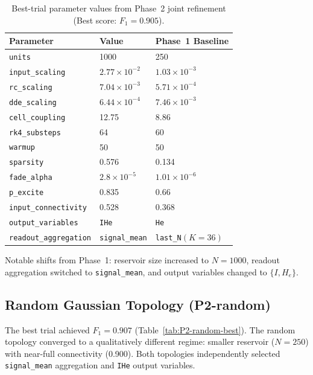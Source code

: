 \documentclass[journal=asbcd6,manuscript=suppinfo]{achemso}
\begin{document}
\begin{table}[H]
    \centering
    \caption{Best-trial parameter values from Phase~2 joint refinement (Best score: $F_1 = 0.905$).}
    \label{tab:P2-distance-best}\small %
    \begin{tabular}{lll}
        \toprule
        Parameter & Value & Phase~1 Baseline \\
        \midrule
        \texttt{units} & 1000 & 250 \tabularnewline
        \texttt{input\_scaling} & $2.77 \times 10^{-2}$ & $1.03 \times 10^{-3}$ \\
        \texttt{rc\_scaling} & $7.04 \times 10^{-3}$ & $5.71 \times 10^{-4}$ \\
        \texttt{dde\_scaling} & $6.44 \times 10^{-4}$ & $7.46 \times 10^{-3}$ \\
        \texttt{cell\_coupling} & 12.75 & 8.86 \\
        \texttt{rk4\_substeps} & 64 & 60 \\
        \texttt{warmup} & 50 & 50 \\
        \texttt{sparsity} & 0.576 & 0.134 \\
        \texttt{fade\_alpha} & $2.8 \times 10^{-5}$ & $1.01 \times 10^{-6}$ \\
        \texttt{p\_excite} & 0.835 & 0.66 \\
        \texttt{input\_connectivity} & 0.528 & 0.368 \\
        \texttt{output\_variables} & \texttt{IHe} & \texttt{He} \\
        \texttt{readout\_aggregation} & \texttt{signal\_mean} & \texttt{last\_N}$(K=36)$ \\
        \bottomrule
    \end{tabular}
\end{table}

Notable shifts from Phase~1: reservoir size increased to $N = 1000$, readout aggregation switched to \texttt{signal\_mean}, and output variables changed to $\{I, H_e\}$.

\subsection{Random Gaussian Topology (P2-random)}

The best trial achieved $F_1 = 0.907$ (Table~\ref{tab:P2-random-best}). 
The random topology converged to a qualitatively different regime: smaller reservoir ($N = 250$) with near-full connectivity (0.900).
Both topologies independently selected \texttt{signal\_mean} aggregation and \texttt{IHe} output variables.
\end{document}
